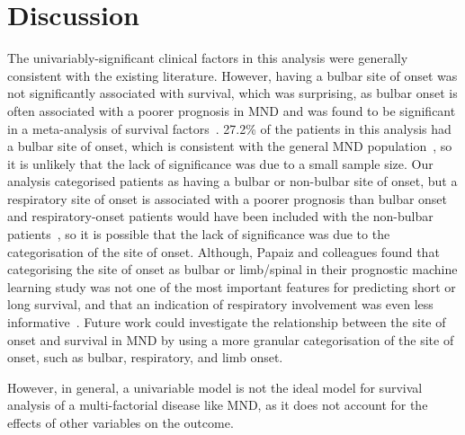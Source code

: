 \section{Discussion}


The univariably-significant clinical factors in this analysis were generally consistent with the existing literature.
However, having a bulbar site of onset was not significantly associated with survival, which was surprising, as bulbar onset is often associated with a poorer prognosis in MND and was found to be significant in a meta-analysis of survival factors~\cite{suPredictorsSurvivalPatients2021}.
27.2\% of the patients in this analysis had a bulbar site of onset, which is consistent with the general MND population~\cite{feldmanAmyotrophicLateralSclerosis2022}, so it is unlikely that the lack of significance was due to a small sample size.
Our analysis categorised patients as having a bulbar or non-bulbar site of onset, but a respiratory site of onset is associated with a poorer prognosis than bulbar onset and respiratory-onset patients would have been included with the non-bulbar patients~\cite{suPredictorsSurvivalPatients2021}, so it is possible that the lack of significance was due to the categorisation of the site of onset.
Although, Papaiz and colleagues found that categorising the site of onset as bulbar or limb/spinal in their prognostic machine learning study was not one of the most important features for predicting short or long survival, and that an indication of respiratory involvement was even less informative~\cite{papaizEnsembleimbalancebasedClassificationAmyotrophic2024}.
Future work could investigate the relationship between the site of onset and survival in MND by using a more granular categorisation of the site of onset, such as bulbar, respiratory, and limb onset.

However, in general, a univariable model is not the ideal model for survival analysis of a multi-factorial disease like MND, as it does not account for the effects of other variables on the outcome.

